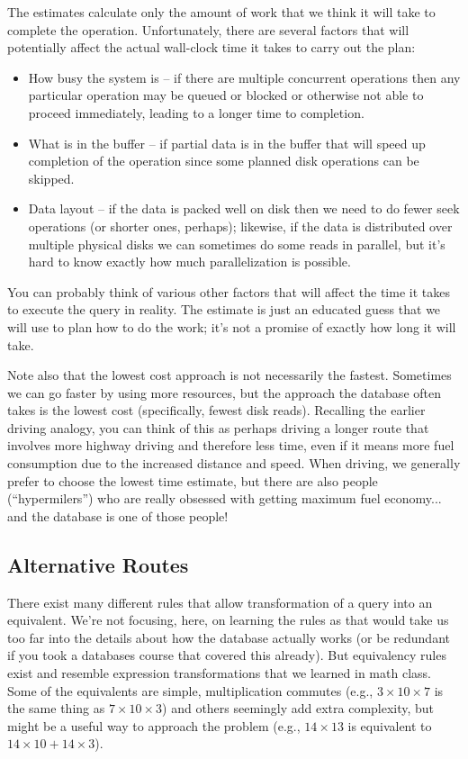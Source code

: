 The estimates calculate only the amount of work that we think it will take to complete the operation. Unfortunately, there are several factors that will potentially affect the actual wall-clock time it takes to carry out the plan:

\begin{itemize}
	\item How busy the system is -- if there are multiple concurrent operations then any particular operation may be queued or blocked or otherwise not able to proceed immediately, leading to a longer time to completion.
	\item What is in the buffer -- if partial data is in the buffer that will speed up completion of the operation since some planned disk operations can be skipped.
	\item Data layout -- if the data is packed well on disk then we need to do fewer seek operations (or shorter ones, perhaps); likewise, if the data is distributed over multiple physical disks we can sometimes do some reads in parallel, but it's hard to know exactly how much parallelization is possible.
\end{itemize}

You can probably think of various other factors that will affect the time it takes to execute the query in reality. The estimate is just an educated guess that we will use to plan how to do the work; it's not a promise of exactly how long it will take.

Note also that the lowest cost approach is not necessarily the fastest. Sometimes we can go faster by using more resources, but the approach the database often takes is the lowest cost (specifically, fewest disk reads). Recalling the earlier driving analogy, you can think of this as perhaps driving a longer route that involves more highway driving and therefore less time, even if it means more fuel consumption due to the increased distance and speed. When driving, we generally prefer to choose the lowest time estimate, but there are also people (``hypermilers'') who are really obsessed with getting maximum fuel economy... and the database is one of those people!

\subsection*{Alternative Routes}
There exist many different rules that allow transformation of a query into an equivalent. We're not focusing, here, on learning the rules as that would take us too far into the details about how the database actually works (or be redundant if you took a databases course that covered this already). But equivalency rules exist and resemble expression transformations that we learned in math class. Some of the equivalents are simple, multiplication commutes (e.g., $3 \times 10 \times 7$ is the same thing as $7 
\times 10 \times 3$) and others seemingly add extra complexity, but might be a useful way to approach the problem (e.g., $14 \times 13$ is equivalent to $14 \times 10 + 14 \times 3$). 

